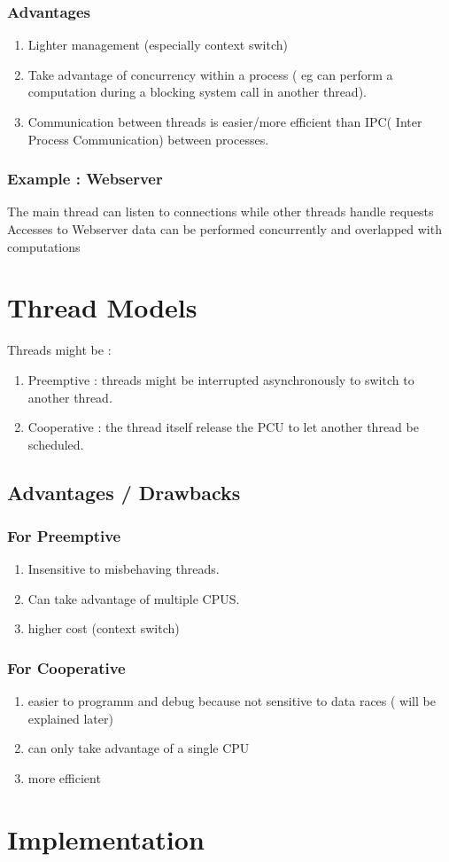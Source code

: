 \documentclass[a4paper,10pt]{article}
\begin{document}
\subsubsection*{Advantages}
\begin{enumerate}
	\item Lighter management (especially context switch)
	\item Take advantage of concurrency within a process ( eg can perform a computation during a blocking system call in another thread).
	\item Communication between threads is easier/more efficient than IPC( Inter Process Communication) between processes.
\end{enumerate}

\subsubsection*{Example : Webserver}

The main thread can listen to connections while other threads handle requests
Accesses to Webserver data can be performed concurrently and overlapped with computations

\section{Thread Models}

Threads might be :

\begin{enumerate}
	\item Preemptive : threads might be interrupted asynchronously to switch to another thread.
	\item Cooperative : the thread itself release the PCU to let another thread be scheduled.
\end{enumerate}

\subsection*{Advantages / Drawbacks}
\subsubsection*{For Preemptive}
\begin{enumerate}
	\item Insensitive to misbehaving threads.
	\item Can take advantage of multiple CPUS.
	\item higher cost (context switch)
\end{enumerate}

\subsubsection*{For Cooperative}
\begin{enumerate}
	\item easier to programm and debug  because not sensitive to data races ( will be explained later)
	\item can only take advantage of a single CPU
	\item more efficient
\end{enumerate}


\section{Implementation}


 
\end{document}
